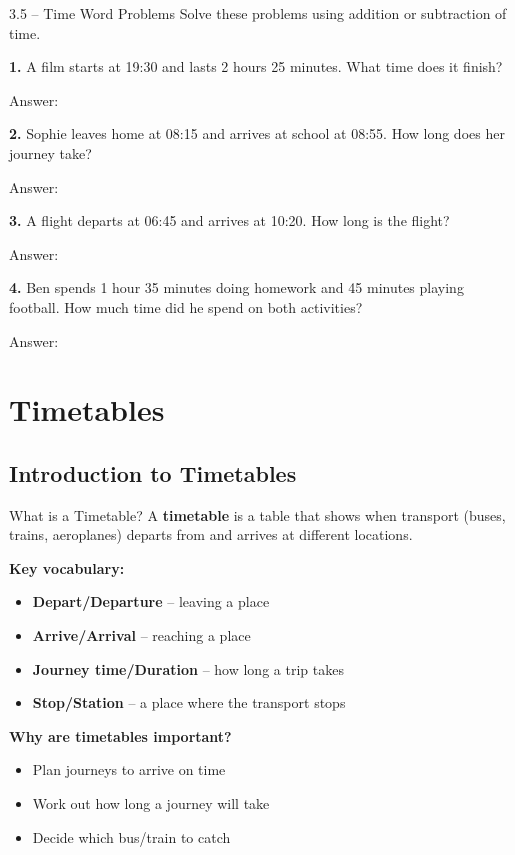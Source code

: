\documentclass[12pt,a4paper]{article}
\begin{document}
\begin{exercisebox}{3.5 -- Time Word Problems}
Solve these problems using addition or subtraction of time.

\textbf{1.} A film starts at 19:30 and lasts 2 hours 25 minutes. What time does it finish?

Answer: \underline{\hspace{4cm}}

\textbf{2.} Sophie leaves home at 08:15 and arrives at school at 08:55. How long does her journey take?

Answer: \underline{\hspace{4cm}}

\textbf{3.} A flight departs at 06:45 and arrives at 10:20. How long is the flight?

Answer: \underline{\hspace{4cm}}

\textbf{4.} Ben spends 1 hour 35 minutes doing homework and 45 minutes playing football. How much time did he spend on both activities?

Answer: \underline{\hspace{4cm}}
\end{exercisebox}

\newpage

\section{Timetables}

\subsection{Introduction to Timetables}

\begin{conceptbox}{What is a Timetable?}
A \textbf{timetable} is a table that shows when transport (buses, trains, aeroplanes) departs from and arrives at different locations.

\textbf{Key vocabulary:}
\begin{itemize}[leftmargin=*]
\item \textbf{Depart/Departure} -- leaving a place
\item \textbf{Arrive/Arrival} -- reaching a place
\item \textbf{Journey time/Duration} -- how long a trip takes
\item \textbf{Stop/Station} -- a place where the transport stops
\end{itemize}

\textbf{Why are timetables important?}
\begin{itemize}[leftmargin=*]
\item Plan journeys to arrive on time
\item Work out how long a journey will take
\item Decide which bus/train to catch
\end{itemize}
\end{conceptbox}
\end{document}
